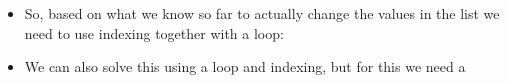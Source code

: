 \documentclass[letterpaper,10pt,english]{sphinxmanual}
\begin{document}
\begin{itemize}
%
\begin{sphinxVerbatim}[commandchars=\\\{\}]
   
       
          
\end{sphinxVerbatim}

\item {} 
So, based on what we know so far to actually change the values in
the list we need to use indexing together with a  loop:

%
\begin{sphinxVerbatim}[commandchars=\\\{\}]
   
      
       
        \PYG{p}{[}\PYG{p}{]}  \PYG{p}{[}\PYG{p}{]}
          
\end{sphinxVerbatim}

\item {} 
We can also solve this using a  loop and indexing, but for
this we need a 

\end{itemize}
\end{document}
